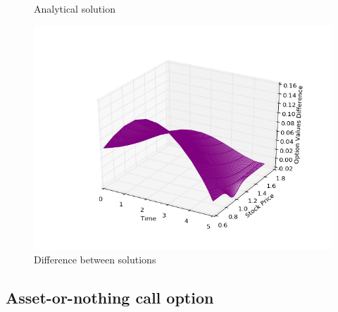 \documentclass[11pt,a4paper]{extarticle}
\begin{document}
\begin{minipage}{\linewidth}
\begin{minipage}{0.29\linewidth}
\begin{figure}[H]
              \caption{Analytical solution}
          \end{figure}
      \end{minipage}
      \hspace{0.04\linewidth}
      \begin{minipage}{0.29\linewidth}
          \begin{figure}[H]
              \includegraphics[width=\linewidth]{Figures/c-o-n-put-dif}
              \caption{Difference between solutions}
          \end{figure}
      \end{minipage}
\end{minipage}

\subsection{Asset-or-nothing call option}
\end{document}
